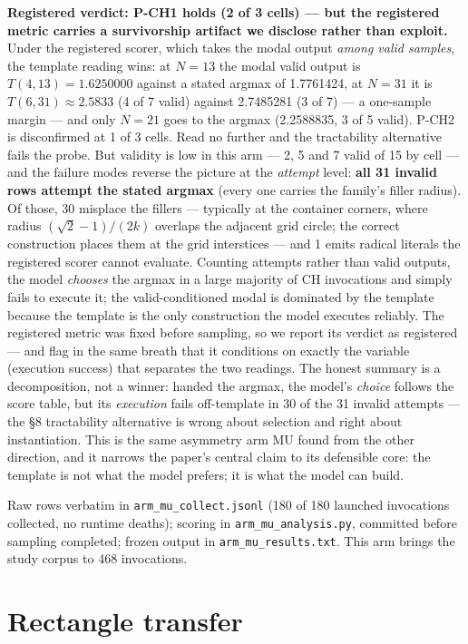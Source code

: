 \documentclass[11pt]{article}
\begin{document}
\textbf{Registered verdict: P-CH1 holds (2 of 3 cells) --- but the registered metric carries
a survivorship artifact we disclose rather than exploit.} Under the registered scorer, which
takes the modal output \textit{among valid samples}, the template reading wins: at $N = 13$
the modal valid output is $T(4,13) = 1.6250000$ against a stated argmax of 1.7761424, at
$N = 31$ it is $T(6,31) \approx 2.5833$ (4 of 7 valid) against 2.7485281 (3 of 7) --- a
one-sample margin --- and only $N = 21$ goes to the argmax (2.2588835, 3 of 5 valid). P-CH2 is disconfirmed at 1 of 3 cells. Read no further and
the tractability alternative fails the probe. But validity is low in this arm --- 2, 5 and 7
valid of 15 by cell --- and the failure modes reverse the picture at the \textit{attempt}
level: \textbf{all 31 invalid rows attempt the stated argmax} (every one carries the family's
filler radius). Of those, 30 misplace the fillers --- typically at the container corners,
where radius $(\sqrt{2}-1)/(2k)$ overlaps the adjacent grid circle; the correct construction
places them at the grid interstices --- and 1 emits radical literals the registered scorer
cannot evaluate. Counting attempts rather than valid outputs, the model \textit{chooses} the
argmax in a large majority of CH invocations and simply fails to execute it; the
valid-conditioned modal is dominated by the template because the template is the only
construction the model executes reliably. The registered metric was fixed before sampling, so
we report its verdict as registered --- and flag in the same breath that it conditions on
exactly the variable (execution success) that separates the two readings. The honest summary
is a decomposition, not a winner: handed the argmax, the model's \textit{choice} follows the
score table, but its \textit{execution} fails off-template in 30 of the 31 invalid attempts
--- the \S8 tractability alternative is wrong about selection and right about instantiation.
This is the same asymmetry arm MU found from the other direction, and it narrows the paper's
central claim to its defensible core: the template is not what the model prefers; it is what
the model can build.

Raw rows verbatim in \texttt{arm\_mu\_collect.jsonl} (180 of 180 launched invocations
collected, no runtime deaths); scoring in \texttt{arm\_mu\_analysis.py}, committed before
sampling completed; frozen output in \texttt{arm\_mu\_results.txt}. This arm brings the study
corpus to 468 invocations.

\section{Rectangle transfer}
\end{document}
